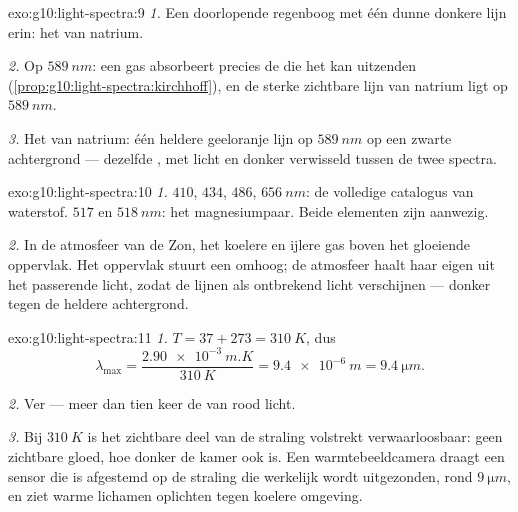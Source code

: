 \begin{solution}{exo:g10:light-spectra:9}
\emph{1.} Een doorlopende regenboog met één dunne donkere lijn erin: het
 van natrium.

\emph{2.} Op $\qty{589}{nm}$: een gas absorbeert precies de 
die het kan uitzenden (\cref{prop:g10:light-spectra:kirchhoff}), en de
sterke zichtbare lijn van natrium ligt op $\qty{589}{nm}$.

\emph{3.} Het  van natrium: één heldere geeloranje lijn
op $\qty{589}{nm}$ op een zwarte achtergrond --- dezelfde ,
met licht en donker verwisseld tussen de twee spectra.
\end{solution}

\begin{solution}{exo:g10:light-spectra:10}
\emph{1.} $410$, $434$, $486$, $\qty{656}{nm}$: de volledige catalogus
van waterstof. $517$ en $\qty{518}{nm}$: het magnesiumpaar. Beide
elementen zijn aanwezig.

\emph{2.} In de atmosfeer van de Zon, het koelere en ijlere gas boven het
gloeiende oppervlak. Het oppervlak stuurt een  omhoog;
de atmosfeer haalt haar eigen  uit het passerende licht, zodat
de lijnen als ontbrekend licht verschijnen --- donker tegen de heldere
achtergrond.
\end{solution}

\begin{solution}{exo:g10:light-spectra:11}
\emph{1.} $T = 37 + 273 = \qty{310}{K}$, dus
\[
\lambda_{\max} = \frac{\qty{2.90e-3}{m.K}}{\qty{310}{K}}
= \qty{9.4e-6}{m} = \qty{9.4}{\micro m}.
\]

\emph{2.} Ver  --- meer dan tien keer de  van rood
licht.

\emph{3.} Bij $\qty{310}{K}$ is het zichtbare deel van de straling
volstrekt verwaarloosbaar: geen zichtbare gloed, hoe donker de kamer ook
is. Een warmtebeeldcamera draagt een sensor die is afgestemd op de
straling die werkelijk wordt uitgezonden, rond $\qty{9}{\micro m}$, en
ziet warme lichamen oplichten tegen koelere omgeving.
\end{solution}

